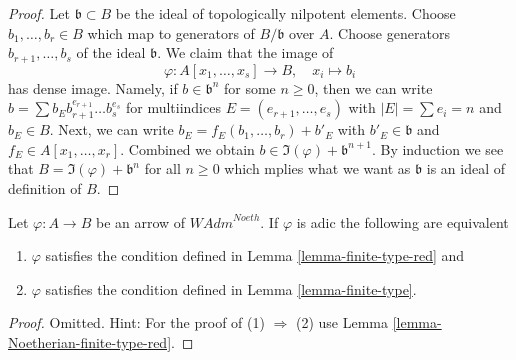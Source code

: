 \begin{proof}
Let $\mathfrak b \subset B$ be the
ideal of topologically nilpotent elements. Choose $b_1, \ldots, b_r \in B$
which map to generators of $B/\mathfrak b$ over $A$.
Choose generators $b_{r + 1}, \ldots, b_s$ of the ideal
$\mathfrak b$. We claim that the image of
$$
\varphi : A[x_1, \ldots, x_s] \longrightarrow B, \quad
x_i \longmapsto b_i
$$
has dense image. Namely, if $b \in \mathfrak b^n$ for some $n \geq 0$,
then we can write
$b = \sum b_E b_{r + 1}^{e_{r + 1}} \ldots b_s^{e_s}$ for multiindices
$E = (e_{r + 1}, \ldots, e_s)$ with $|E| = \sum e_i = n$ and $b_E \in B$.
Next, we can write $b_E = f_E(b_1, \ldots, b_r) + b'_E$
with $b'_E \in \mathfrak b$ and $f_E \in A[x_1, \ldots, x_r]$.
Combined we obtain $b \in \Im(\varphi) + \mathfrak b^{n + 1}$.
By induction we see that $B = \Im(\varphi) + \mathfrak b^n$ for all
$n \geq 0$ which mplies what we want as $\mathfrak b$ is an ideal
of definition of $B$.
\end{proof}

\begin{lemma}
\label{lemma-Noetherian-adic-finite-type-red}
Let $\varphi : A \to B$ be an arrow of $\textit{WAdm}^{Noeth}$.
If $\varphi$ is adic the following are equivalent
\begin{enumerate}
\item $\varphi$ satisfies the condition defined in
Lemma \ref{lemma-finite-type-red} and
\item $\varphi$ satisfies the condition defined in
Lemma \ref{lemma-finite-type}.
\end{enumerate}
\end{lemma}

\begin{proof}
Omitted. Hint: For the proof of (1) $\Rightarrow$ (2) use
Lemma \ref{lemma-Noetherian-finite-type-red}.
\end{proof}

